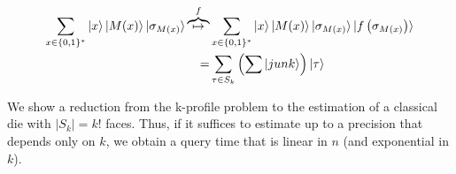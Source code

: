 \documentclass[manuscript,screen,review]{acmart}
\begin{document}
\begin{equation*}
  \begin{split}
    \sum_{x\in \{0,1\}^{*}}{\ket{x}\ket{M(x)}\ket{\sigma_{M(x)} }}\overbrace{\mapsto}^f & \sum_{x\in \{0,1\}^{*}}{\ket{x}\ket{M(x)}\ket{\sigma_{M(x)} }\ket{f\left( \sigma_{M(x)}  \right) } } \\ 
    =  &  \sum_{ \tau \in S_{k}}{ \left(\sum{\ket{junk}} \right) \ket{\tau}}
  \end{split}
\end{equation*}

We show a reduction from the k-profile problem to the estimation of a classical die with $|S_k| = k!$ faces. Thus, if it suffices to estimate up to a precision that depends only on $k$, we obtain a query time that is linear in $n$ (and exponential in $k$).  




\printbibliography
\end{document}
